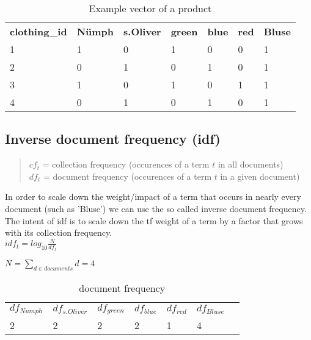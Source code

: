 \noindent
\begin{table}[h]
    \begin{center}
    \begin{tabular}{ l l l l l l l }
        \rowcolor{Gray}
        \textbf{clothing\_id}   & \textbf{N\"umph} & \textbf{s.Oliver}   & \textbf{green}    & \textbf{blue} & \textbf{red} & \textbf{Bluse}\\
        1                       & 1                 & 0                 & 1                 & 0             & 0             & 1\\
        2                       & 0                 & 1                 & 0                 & 1             & 0             & 1\\
        3                       & 1                 & 0                 & 1                 & 0             & 1             & 1\\
        4                       & 0                 & 1                 & 0                 & 1             & 0             & 1\\
    \end{tabular}
    \caption{Example vector of a product}
    \end{center}
\end{table}


\subsection{Inverse document frequency (idf)}
\begin{quote}
    $cf_t$ = collection frequency (occurences of a term $t$ in all documents)\\
    $df_t$ = document frequency (occurences of a term $t$ in a given document)
\end{quote}
In order to scale down the weight/impact of a term that occurs in nearly every document (such as 'Bluse') we can use the so called inverse document frequency.\\
The intent of idf is to scale down the tf weight of a term by a factor that grows with its collection frequency.\\

$idf_t = log_{10}\frac{N}{df_{t}}$

\bigskip
$N = \displaystyle\sum_{d \in documents}{d} = 4$

\bigskip
\begin{table}[h]
    \begin{center}
    \begin{tabular}{ l l l l l l l }
        \rowcolor{Gray}
        \textbf{$df_{Numph}$} & \textbf{$df_{s.Oliver}$} & \textbf{$df_{green}$} & \textbf{$df_{blue}$} & \textbf{$df_{red}$} & \textbf{$df_{Bluse}$}\\
        2                     & 2                        & 2                     & 2                    & 1                   & 4\\
    \end{tabular}
    \caption{document frequency}
    \end{center}
\end{table}

